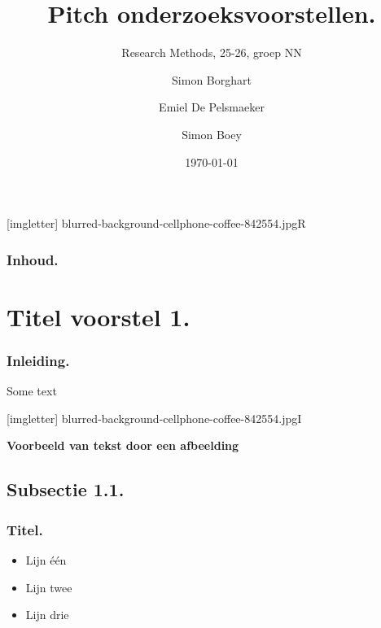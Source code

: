 \documentclass[aspectratio=169]{beamer}
\title{Pitch onderzoeksvoorstellen.}
\subtitle{Research Methods, 25-26, groep NN}
\author{Simon Borghart \and Emiel De Pelsmaeker \and Simon Boey}
\date{\today}
\begin{document}
{

    [imgletter]
        {blurred-background-cellphone-coffee-842554.jpg}{R}

    \begin{frame}
        \maketitle
    \end{frame}
}

\begin{frame}
    \frametitle{Inhoud.}

    \tableofcontents
\end{frame}

\section{Titel voorstel 1.}

\begin{frame}
    \frametitle{Inleiding.}

    Some text
\end{frame}

{
[imgletter]
    {blurred-background-cellphone-coffee-842554.jpg}{I}

\begin{frame}

    {\huge \textbf{Voorbeeld van tekst door een afbeelding}}

\end{frame}
}

\subsection{Subsectie 1.1.}

\begin{frame}
    \frametitle{Titel.}

    \begin{itemize}
        \item Lijn één
        \item Lijn twee
        \item Lijn drie
    \end{itemize}
\end{frame}
\end{document}
